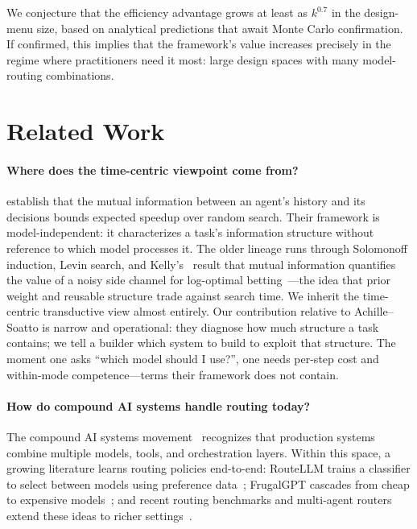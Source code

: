 \documentclass[twoside,11pt]{article}
\begin{document}
We conjecture that the efficiency advantage grows at least as $k^{0.7}$ in the design-menu size, based on analytical predictions that await Monte Carlo confirmation.
If confirmed, this implies that the framework's value increases precisely in the regime where practitioners need it most: large design spaces with many model-routing combinations.

\section{Related Work}
\label{sec:related}

\paragraph{Where does the time-centric viewpoint come from?}
\citet{achille2025agents} establish that the mutual information between an agent's history and its decisions bounds expected speedup over random search.
Their framework is model-independent: it characterizes a task's information structure without reference to which model processes it.
The older lineage runs through Solomonoff induction, Levin search, and Kelly's~\citeyearpar{kelly1956new} result that mutual information quantifies the value of a noisy side channel for log-optimal betting~\citep{cover2006elements}---the idea that prior weight and reusable structure trade against search time.
We inherit the time-centric transductive view almost entirely.
Our contribution relative to Achille--Soatto is narrow and operational: they diagnose how much structure a task contains; we tell a builder which system to build to exploit that structure.
The moment one asks ``which model should I use?'', one needs per-step cost and within-mode competence---terms their framework does not contain.

\paragraph{How do compound AI systems handle routing today?}
The compound AI systems movement~\citep{zaharia2024compound} recognizes that production systems combine multiple models, tools, and orchestration layers.
Within this space, a growing literature learns routing policies end-to-end: RouteLLM trains a classifier to select between models using preference data~\citep{ong2024routellm}; FrugalGPT cascades from cheap to expensive models~\citep{chen2023frugalgpt}; and recent routing benchmarks and multi-agent routers extend these ideas to richer settings~\citep{hu2024routerbench,anonymous2026llmrouterbench,yue2025masrouter}.
\end{document}
